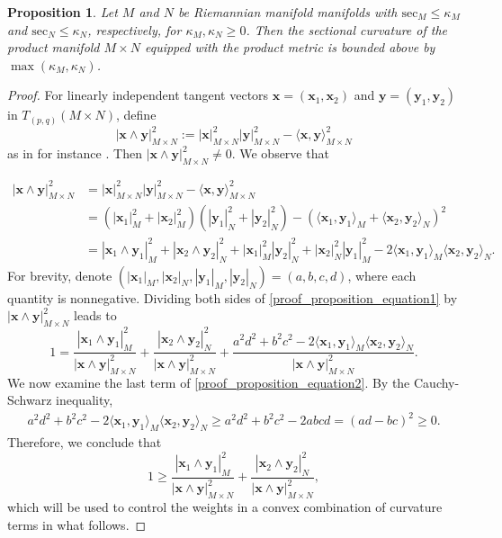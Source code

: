 \documentclass[10pt]{article}
\newtheorem{proposition}[theorem]{Proposition}
\newcommand{\bfx}{\boldsymbol{x}}
\newcommand{\bfy}{\boldsymbol{y}}
\begin{document}
\begin{proposition}\label{theory:curvature_bound}
Let $M$ and $N$ be Riemannian manifold manifolds with $\text{sec}_M \leq \kappa_M$ and $\text{sec}_N \leq \kappa_N$, respectively, for $\kappa_M, \kappa_N \geq 0$. Then the sectional curvature of the product manifold $M\times N$ equipped with the product metric is bounded above by $\max(\kappa_M, \kappa_N)$. 
\end{proposition}
\begin{proof}
For linearly independent tangent vectors $\bfx = (\bfx_1,\bfx_2)$ and $\bfy = (\bfy_1,\bfy_2)$ in $T_{(p,q)}(M\times N)$, define $$|\bfx \wedge \bfy |^2_{M\times N}:= |\bfx|^2_{M\times N} |\bfy|^2_{M\times N} - \langle \bfx,\bfy \rangle^2_{M\times N}$$ as in for instance \citep{lee_2012_IntroductionSmoothManifolds}. Then $|\bfx \wedge \bfy |^2_{M\times N} \ne 0$. We observe that

\begin{equation}\label{proof_proposition_equation1}
	\begin{aligned}
		|\bfx\wedge \bfy|_{M\times N}^2 &= |\bfx|^2_{M\times N} |\bfy|^2_{M\times N} - \langle \bfx,\bfy \rangle^2_{M\times N} \\ 
		&= (|\bfx_1|^2_M + |\bfx_2|^2_M)(|\bfy_1|^2_N + |\bfy_2|^2_N) - (\langle \bfx_1, \bfy_1\rangle_M + \langle \bfx_2,\bfy_2\rangle_N)^2 \\
		&=|\bfx_1\wedge \bfy_1|_M^2 + |\bfx_2 \wedge \bfy_2|_N^2 + |\bfx_1|_M^2 |\bfy_2|_N^2 + |\bfx_2|_N^2 |\bfy_1|_M^2 - 2\langle \bfx_1, \bfy_1\rangle_M \langle \bfx_2,\bfy_2\rangle_N.
	\end{aligned}
\end{equation}
For brevity, denote $(|\bfx_1|_M, |\bfx_2|_N, |\bfy_1|_M, |\bfy_2|_N)=(a,b,c,d)$, where each quantity is nonnegative. Dividing both sides of  \eqref{proof_proposition_equation1} by $|\bfx\wedge \bfy|^2_{M\times N}$ leads to 
\begin{equation}\label{proof_proposition_equation2}
	1 = \frac{|\bfx_1\wedge \bfy_1|_M^2}{|\bfx\wedge \bfy|^2_{M\times N}} + \frac{|\bfx_2 \wedge \bfy_2|_N^2}{|\bfx\wedge \bfy|^2_{M\times N}} + 
	\frac{a^2d^2 + b^2 c^2 - 2\langle \bfx_1, \bfy_1\rangle_M \langle \bfx_2,\bfy_2\rangle_N}{|\bfx\wedge \bfy|^2_{M\times N}}.
\end{equation}
We now examine the last term of \eqref{proof_proposition_equation2}. By the Cauchy-Schwarz inequality,
\begin{align*}
	a^2 d^2 + b^2 c^2 - 2\langle \bfx_1, \bfy_1\rangle_M \langle \bfx_2,\bfy_2\rangle_N \geq a^2d^2 + b^2c^2 - 2abcd = (ad-bc)^2 \geq 0.
\end{align*}
Therefore, we conclude that 
\begin{equation}\label{proof_proposition_equation3}
	1 \geq \frac{|\bfx_1\wedge \bfy_1|_M^2}{|\bfx\wedge \bfy|^2_{M\times N}} + \frac{|\bfx_2 \wedge \bfy_2|_N^2}{|\bfx\wedge \bfy|^2_{M\times N}},
\end{equation}
which will be used to control the weights in a convex combination of curvature terms in what follows. 



\end{proof}
\end{document}
